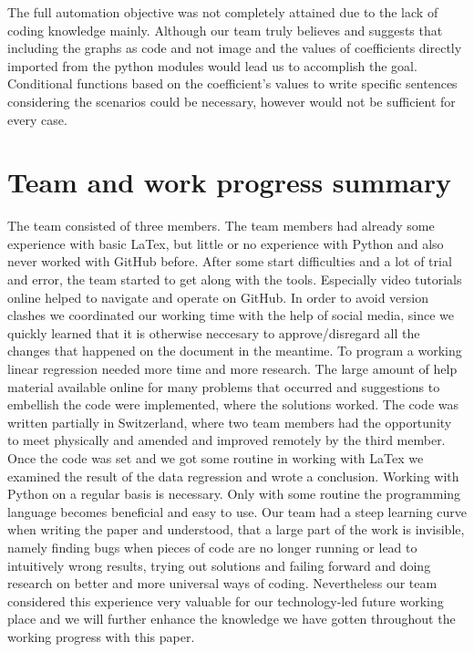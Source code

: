 \documentclass[12pt,a4paper,bibliography=totocnumbered,listof=totocnumbered]{scrartcl}
\begin{document}
The full automation objective was not completely attained due to the lack of coding knowledge mainly. Although our team truly believes and suggests that including the graphs as code and not image and the values of coefficients directly imported from the python modules would lead us to accomplish the goal. Conditional functions based on the coefficient's values to write specific sentences considering the scenarios could be necessary, however would not be sufficient for every case.

\section{Team and work progress summary}
The team consisted of three members. The team members had already some experience with basic LaTex, but little or no experience with Python and also never worked with GitHub before. After some start difficulties and a lot of trial and error, the team started to get along with the tools. Especially video tutorials online helped to navigate and operate on GitHub. In order to avoid version clashes we coordinated our working time with the help of social media, since we quickly learned that it is otherwise neccesary to approve/disregard all the changes that happened on the document in the meantime. To program a working linear regression needed more time and more research. The large amount of help material available online for many problems that occurred and suggestions to embellish the code were implemented, where the solutions worked. The code was written partially in Switzerland, where two team members had the opportunity to meet physically and amended and improved remotely by the third member. Once the code was set and we got some routine in working with LaTex we examined the result of the data regression and wrote a conclusion. Working with Python on a regular basis is necessary. Only with some routine the programming language becomes beneficial and easy to use. Our team had a steep learning curve when writing the paper and understood, that a large part of the work is invisible, namely finding bugs when pieces of code are no longer running or lead to intuitively wrong results, trying out solutions and failing forward and doing research on better and more universal ways of coding. Nevertheless our team considered this experience very valuable for our technology-led future working place and we will further enhance the knowledge we have gotten throughout the working progress with this paper.

%
\end{document}
